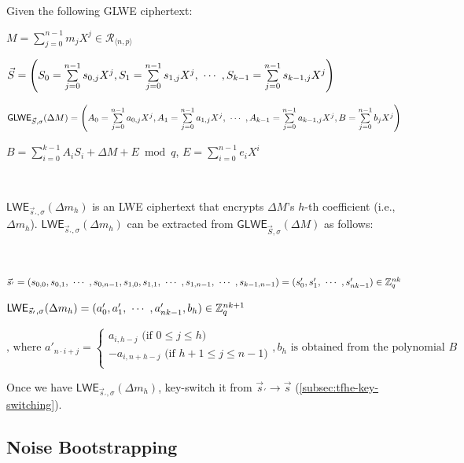 \begin{tcolorbox}[title={\textbf{\tboxlabel{\ref*{subsec:tfhe-extraction}} GLWE Ciphertext's Coefficient Extraction}}]
Given the following GLWE ciphertext: 

$M = \sum\limits_{j=0}^{n-1}m_jX^j \in \mathcal{R}_{\langle n, p \rangle}$

$\vec{S} = \left(S_0 = \sum\limits_{j=0}^{n-1}s_{0,j}X^j, S_1 = \sum\limits_{j=0}^{n-1}s_{1,j}X^j, \text{ } \text{$\cdots$} \text{ }, S_{k-1} = \sum\limits_{j=0}^{n-1}s_{k-1,j}X^j \right)$

$\textsf{GLWE}_{\vec{S}, \sigma}(\Delta M) = \left(A_0 = \sum\limits_{j=0}^{n-1}a_{0,j}X^j, A_1 = \sum\limits_{j=0}^{n-1}a_{1,j}X^j, \text{ } \text{$\cdots$} \text{ }, A_{k-1} = \sum\limits_{j=0}^{n-1}a_{k-1,j}X^j, B = \sum\limits_{j=0}^{n-1}b_{j}X^j\right)$

$B = \sum\limits_{i=0}^{k-1}A_iS_i + \Delta M + E \bmod q$, \text{ } $E = \sum\limits_{i=0}^{n-1}e_iX^i$

$ $

$\textsf{LWE}_{\vec{s}_{'}, \sigma}(\Delta m_h)$ is an LWE ciphertext that encrypts $\Delta M$'s $h$-th coefficient (i.e., $\Delta m_h$). $\textsf{LWE}_{\vec{s}_{'}, \sigma}(\Delta m_h)$ can be extracted from $\textsf{GLWE}_{\vec{S}, \sigma}(\Delta M)$ as follows: 

$ $

$\vec{s}_{'} = (s_{0,0}, s_{0,1}, \text{ } \text{$\cdots$} \text{ }, s_{0,n-1}, s_{1,0}, s_{1,1}, \text{ } \text{$\cdots$} \text{ }, s_{1, n-1}, \text{ } \text{$\cdots$} \text{ }, s_{k-1, n-1}) = (s'_0, s'_1, \text{ } \text{$\cdots$} \text{ }, s'_{nk-1} ) \in \mathbb{Z}_q^{nk}$

$\textsf{LWE}_{\vec{s}_{'}, \sigma}(\Delta m_h) = (a_0', a_1', \text{ } \text{$\cdots$} \text{ } , a_{nk-1}', b_h) \in \mathbb{Z}_q^{nk + 1}$


\[
    \text{, where } a'_{n \cdot i + j} =   
\begin{cases}
    a_{i,h - j} \text{ (if } 0 \leq j \leq h\text{)}\\
    -a_{i,n + h - j} \text{ (if } h+1 \leq j \leq n-1\text{)}\\
\end{cases}
, b_h \text{ is obtained from the polynomial } B
\]

Once we have $\textsf{LWE}_{\vec{s}_{'}, \sigma}(\Delta m_h)$, key-switch it from $\vec{s}_{'} \rightarrow \vec{s}$ (\autoref{subsec:tfhe-key-switching}).

\end{tcolorbox}



\subsection{Noise Bootstrapping}
\label{subsec:tfhe-noise-bootstrapping}


